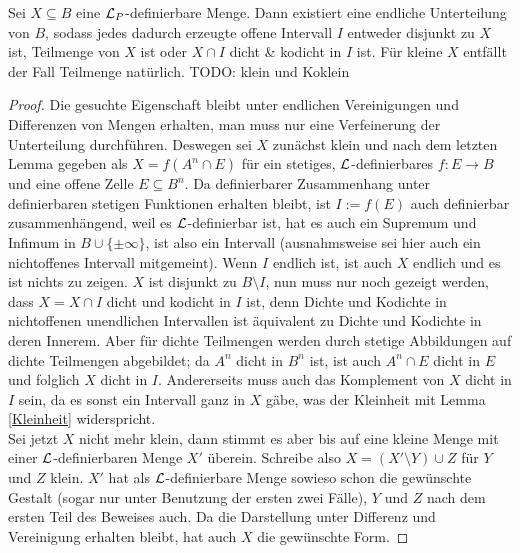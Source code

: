 \begin{theorem}\label{Satz 4}
	Sei $X\subseteq B$ eine $\mathcal{L}_P$-definierbare Menge. Dann existiert eine endliche Unterteilung von $B$, sodass jedes dadurch erzeugte offene Intervall $I$ entweder disjunkt zu $X$ ist, Teilmenge von $X$ ist oder $X\cap I$ dicht \& kodicht in $I$ ist. Für kleine $X$ entfällt der Fall \glqq{}Teilmenge\grqq{} natürlich. TODO: klein und Koklein
\end{theorem}
\begin{proof}
	Die gesuchte Eigenschaft bleibt unter endlichen Vereinigungen und Differenzen von Mengen erhalten, man muss nur eine Verfeinerung der Unterteilung durchführen. Deswegen sei $X$ zunächst klein und nach dem letzten Lemma gegeben als $X=f(A^n\cap E)$ für ein stetiges, $\mathcal{L}$-definierbares $f:E\rightarrow B$ und eine offene Zelle $E\subseteq B^n$. Da definierbarer Zusammenhang unter definierbaren stetigen Funktionen erhalten bleibt, ist $I:=f(E)$ auch definierbar zusammenhängend, weil es $\mathcal{L}$-definierbar ist, hat es auch ein Supremum und Infimum in $B\cup\{\pm\infty\}$, ist also ein Intervall (ausnahmsweise sei hier auch ein nichtoffenes Intervall mitgemeint). Wenn $I$ endlich ist, ist auch $X$ endlich und es ist nichts zu zeigen. $X$ ist disjunkt zu $B\setminus I$, nun muss nur noch gezeigt werden, dass $X=X\cap I$ dicht und kodicht in $I$ ist, denn Dichte und Kodichte in nichtoffenen unendlichen Intervallen ist äquivalent zu Dichte und Kodichte in deren Innerem. Aber für dichte Teilmengen werden durch stetige Abbildungen auf dichte Teilmengen abgebildet; da $A^n$ dicht in $B^n$ ist, ist auch $A^n\cap E$ dicht in $E$ und folglich $X$ dicht in $I$. Andererseits muss auch das Komplement von $X$ dicht in $I$ sein, da es sonst ein Intervall ganz in $X$ gäbe, was der Kleinheit mit Lemma \ref{Kleinheit} widerspricht.\\
	Sei jetzt $X$ nicht mehr klein, dann stimmt es aber bis auf eine kleine Menge mit einer $\mathcal{L}$-definierbaren Menge $X'$ überein. Schreibe also $X=(X'\setminus Y)\cup Z$ für $Y$ und $Z$ klein. $X'$ hat als $\mathcal{L}$-definierbare Menge sowieso schon die gewünschte Gestalt (sogar nur unter Benutzung der ersten zwei Fälle), $Y$ und $Z$ nach dem ersten Teil des Beweises auch. Da die Darstellung unter Differenz und Vereinigung erhalten bleibt, hat auch $X$ die gewünschte Form.
\end{proof}

